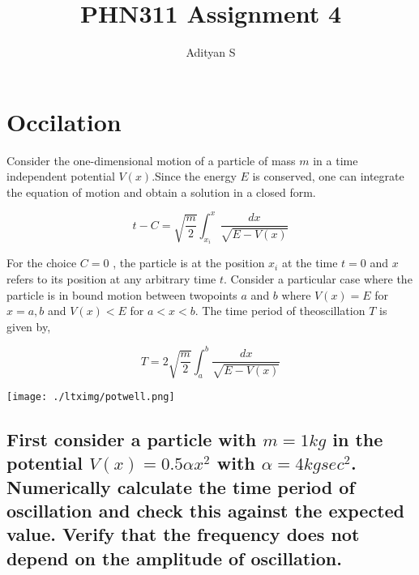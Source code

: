 \documentclass[a4paper,11pt,twoside]{article}
\author{Adityan S}
\date{}
\title{PHN311 Assignment 4}
\begin{document}
\maketitle
\tableofcontents

\clearpage

\section{Occilation}
\label{sec:org0e153b7}
Consider the one-dimensional motion of a particle of mass \(m\) in a time independent potential \(V(x)\).Since the energy \(E\) is conserved, one can integrate the equation of motion and obtain a solution in a closed form.

$$
t-C = \sqrt{\frac{m}{2}}\int_{x_i}^x \frac{dx}{\sqrt{E-V(x)}}
$$

For the choice \(C=0\) , the particle is at the position \(x_i\) at the time \(t = 0\) and \(x\) refers to its position at any arbitrary time \(t\). Consider a particular case where the particle is in bound motion between twopoints \(a\) and \(b\) where \(V(x) = E\) for \(x = a, b\) and \(V(x) < E\) for \(a < x < b\). The time period of theoscillation \(T\) is given by,

$$
T = 2 \sqrt{\frac{m}{2}}\int_a^b \frac{dx}{\sqrt{E-V(x)}}
$$

\begin{center}
\texttt{[image: ./ltximg/potwell.png]}
\end{center}


\subsection{First consider a particle with \(m = 1 kg\) in the potential \(V(x) = 0.5 \alpha x^2\) with \(\alpha =4 kg sec^2\). Numerically calculate the time period of oscillation and check this against the expected value. Verify that the frequency does not depend on the amplitude of oscillation.}
\label{sec:orgc713963}


\begin{center}
\end{center}
\end{document}

